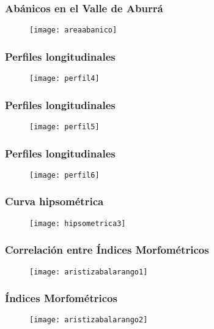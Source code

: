 \documentclass{beamer}
\begin{document}
\begin{frame}
\frametitle{Abánicos en el Valle de Aburrá}
 \begin{figure}
    \centering
    \texttt{[image: areaabanico]}
  \end{figure}
\end{frame}
\begin{frame}
\frametitle{Perfiles longitudinales}
 \begin{figure}
    \centering
    \texttt{[image: perfil4]}
  \end{figure}
\end{frame}
\begin{frame}
\frametitle{Perfiles longitudinales}
 \begin{figure}
    \centering
    \texttt{[image: perfil5]}
  \end{figure}
\end{frame}
\begin{frame}
\frametitle{Perfiles longitudinales}
 \begin{figure}
    \centering
    \texttt{[image: perfil6]}
  \end{figure}
\end{frame}
\begin{frame}
\frametitle{Curva hipsométrica}
 \begin{figure}
    \centering
    \texttt{[image: hipsometrica3]}
  \end{figure}
\end{frame}
\begin{frame}
\frametitle{Correlación entre Índices Morfométricos}
 \begin{figure}
    \centering
    \texttt{[image: aristizabalarango1]}
  \end{figure}
\end{frame}
\begin{frame}
\frametitle{Índices Morfométricos}
 \begin{figure}
    \centering
    \texttt{[image: aristizabalarango2]}
  \end{figure}
\end{frame}
\end{document}
